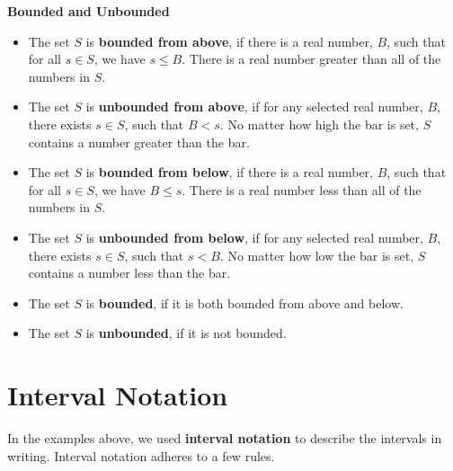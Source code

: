 \documentclass{ximera}
\begin{document}
\begin{definition} \item \textbf{\textcolor{green!50!black}{Bounded and Unbounded}}

\begin{itemize}
\item The set $S$ is \textbf{bounded from above}, if there is a real number, $B$, such that for all $s \in S$, we have $s \leq B$.  There is a real number greater than all of the numbers in $S$.  \\

\item The set $S$ is \textbf{unbounded from above}, if for any selected real number, $B$, there exists $s \in S$, such that $B < s$. No matter how high the bar is set, $S$ contains a number greater than the bar.  \\

\item The set $S$ is \textbf{bounded from below}, if there is a real number, $B$, such that for all $s \in S$, we have $B \leq s$.  There is a real number less than all of the numbers in $S$.  \\

\item The set $S$ is \textbf{unbounded from below}, if for any selected real number, $B$, there exists $s \in S$, such that $s < B$. No matter how low the bar is set, $S$ contains a number less than the bar.  \\

\item The set $S$ is \textbf{bounded}, if it is both bounded from above and below.  

\item The set $S$ is \textbf{unbounded}, if it is not bounded.  \\
\end{itemize}


\end{definition}






\section{Interval Notation}

In the examples above, we used \textbf{interval notation} to describe the intervals in writing. Interval notation adheres to a few rules.
\end{document}
